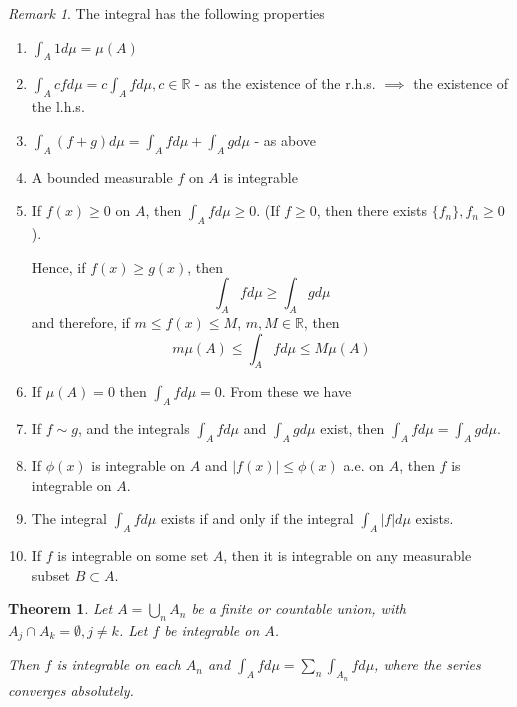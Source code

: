\documentclass[11pt,a4paper]{report}
\theoremstyle{plain}
\newtheorem{thm}{Theorem}[section]
\theoremstyle{definition}
\theoremstyle{remark}
\newtheorem*{rem}{Remark}
\newcommand{\intersection}{\cap}
\newcommand{\Union}{\bigcup}
\newcommand{\R}{\mathbb{R}}
\newcommand{\abs}[1]{\left| #1 \right|}
\begin{document}
\begin{rem}
    The integral has the following properties
    \begin{enumerate}[label=\Roman*)]
        \item $\int_A 1 d \mu = \mu(A)$
        \item $\int_A c f d\mu = c \int_A f d \mu, c \in \R$ - as the existence of the r.h.s. $\implies$ the existence of the l.h.s.
        \item $\int_A (f + g) d \mu = \int_A f d \mu + \int_A g d \mu$ - as above
        \item A bounded measurable $f$ on $A$ is integrable \label{bounded_measurable_is_integrable}
        \item If $f(x) \ge 0$ on $A$, then $\int_A f d \mu \ge 0$. (If $f \ge 0$, then there exists $\{ f_n \}, f_n \ge 0$).
    
            Hence, if $f(x) \ge g(x)$, then $$ \int_A f d\mu \ge \int_A g d\mu $$ and therefore, if $m \le f(x) \le M$, $m, M \in \R$, then
            $$ m\mu(A) \le \int_A f d\mu \le M\mu(A) $$
    
        \item If $\mu(A) = 0$ then $\int_A f d\mu = 0$. From these we have
        \item If $ f \sim g $, and the integrals $\int_A f d\mu$ and $\int_A g d\mu$ exist, then $\int_A f d\mu = \int_A g d\mu$.
        \item
            If $\phi(x)$ is integrable on $A$ and $\abs{f(x)} \le \phi(x)$ a.e. on $A$, then $f$ is integrable on $A$.
        \item The integral $\int_A f d\mu$ exists if and only if the integral $\int_A \abs{f} d\mu$ exists.
        \item If $f$ is integrable on some set $A$, then it is integrable on any measurable subset $B \subset A$.
    \end{enumerate}
\end{rem}

\begin{thm}\label{sigma_additivity_of_the_integral}
    Let $A = \Union_n A_n$ be a finite or countable union, with $A_j \intersection A_k = \emptyset, j \ne k$. Let $f$ be integrable on $A$.

    Then $f$ is integrable on each $A_n$ and $\int_A f d\mu = \sum_n \int_{A_n} f d \mu$, where the series converges absolutely.
\end{thm}
\end{document}
